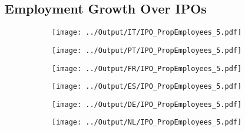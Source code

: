 \documentclass[12pt,notitlepage]{article}
\begin{document}
\subsection{Employment Growth Over IPOs}
\FloatBarrier
\begin{figure}[!htpb]
\centering
\begin{subfigure}{.49\textwidth}
    \centering
 \texttt{[image: ../Output/IT/IPO\_PropEmployees\_5.pdf]}
\end{subfigure}%
\begin{subfigure}{.49\textwidth}
    \centering
 \texttt{[image: ../Output/PT/IPO\_PropEmployees\_5.pdf]}
\end{subfigure}
\begin{subfigure}{.49\textwidth}
    \centering
 \texttt{[image: ../Output/FR/IPO\_PropEmployees\_5.pdf]}
\end{subfigure}%
\begin{subfigure}{.49\textwidth}
    \centering
 \texttt{[image: ../Output/ES/IPO\_PropEmployees\_5.pdf]}
\end{subfigure}
\begin{subfigure}{.49\textwidth}
    \centering
 \texttt{[image: ../Output/DE/IPO\_PropEmployees\_5.pdf]}
\end{subfigure}
\begin{subfigure}{.49\textwidth}
    \centering
 \texttt{[image: ../Output/NL/IPO\_PropEmployees\_5.pdf]}
\end{subfigure}
\end{figure}


\FloatBarrier
\end{document}
